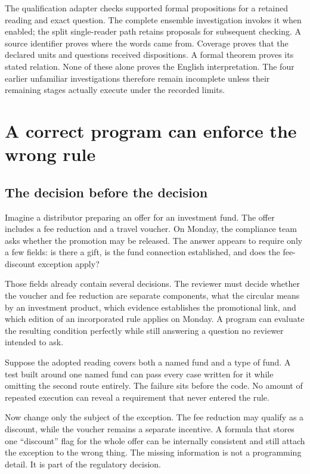 \documentclass[12pt,a4paper,oneside,openany]{book}
\begin{document}
The qualification adapter checks supported formal propositions for a retained
reading and exact question. The complete ensemble investigation invokes it when
enabled; the split single-reader path retains proposals for subsequent checking.
A source identifier proves where the words came from. Coverage proves that the
declared units and questions received dispositions. A formal theorem proves its
stated relation. None of these alone proves the English interpretation. The
four earlier unfamiliar investigations therefore remain incomplete unless their
remaining stages actually execute under the recorded limits.

\endgroup
\clearpage

\tableofcontents
\mainmatter
\chapter{A correct program can enforce the wrong rule}
\label{ch:problem}

\section{The decision before the decision}
\label{merge:M01:00}

\label{sec:problem-decision}
Imagine a distributor preparing an offer for an investment fund. The offer
includes a fee reduction and a travel voucher. On Monday, the compliance team
asks whether the promotion may be released. The answer appears to require only a
few fields: is there a gift, is the fund connection established, and does the
fee-discount exception apply?

Those fields already contain several decisions. The reviewer must decide whether
the voucher and fee reduction are separate components, what the circular means by
an investment product, which evidence establishes the promotional link, and
which edition of an incorporated rule applies on Monday. A program can evaluate
the resulting condition perfectly while still answering a question no reviewer
intended to ask.

Suppose the adopted reading covers both a named fund and a type of fund. A test
built around one named fund can pass every case written for it while omitting the
second route entirely. The failure sits before the code. No amount of repeated
execution can reveal a requirement that never entered the rule.

Now change only the subject of the exception. The fee reduction may qualify as a
discount, while the voucher remains a separate incentive. A formula that stores
one ``discount'' flag for the whole offer can be internally consistent and still
attach the exception to the wrong thing. The missing information is not a
programming detail. It is part of the regulatory decision.
\end{document}
